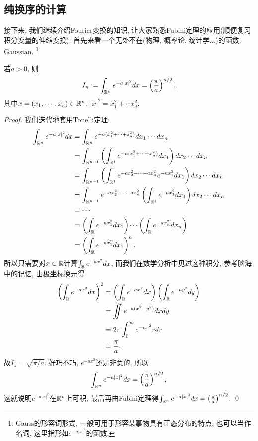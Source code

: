 \subsection{纯换序的计算}
接下来, 我们继续介绍Fourier变换的知识, 让大家熟悉Fubini定理的应用(顺便复习积分变量的伸缩变换). 首先来看一个无处不在(物理, 概率论, 统计学...)的函数: Gaussian.
\footnote{Gauss的形容词形式, 一般可用于形容某事物具有正态分布的特点, 也可以当作名词, 这里指形如$e^{-a|x|^2}$的函数.}
\begin{example}[~(Gaussian)]
    若$a>0$, 则
    $$I_n := \int_{\mathbb{R}^n}e^{-a|x|^2}dx = \left(\frac{\pi}{a}\right)^{n/2},$$
    其中$x=(x_1, \cdots, x_n) \in \mathbb{R}^n$, $|x|^2 = x_1^2 + \cdots x_d^2$.
\end{example}
\begin{proof}
    我们迭代地套用Tonelli定理:
    \begin{align*}
    \int_{\mathbb{R}^n}e^{-a|x|^2}dx 
    &= \int_{\mathbb{R}^n}e^{-a(x_1^2+\cdots+x_n^2)} dx_1 \cdots dx_n \\
    &= \int_{\mathbb{R}^{n-1}}\left(\int_{\mathbb{R}^1}e^{-a(x_1^2+\cdots+x_n^2)}dx_1 \right)dx_2 \cdots dx_n \\
    &= \int_{\mathbb{R}^{n-1}}\left(\int_{\mathbb{R}^1}e^{-ax_2^2-\cdots-ax_n^2}e^{-ax_1^2}dx_1\right) 
       dx_2 \cdots dx_n \\
    &= \int_{\mathbb{R}^{n-1}}e^{-ax_2^2-\cdots-ax_n^2} \left(\int_{\mathbb{R}^1}e^{-ax_1^2}dx_1\right) 
       dx_2 \cdots dx_n \\
    &= \cdots \\
    &= \left(\int_{\mathbb{R}} e^{-ax_1^2}dx_1\right) \cdots \left(\int_{\mathbb{R}} e^{-ax_n^2}dx_n\right) \\
    &= \left(\int_{\mathbb{R}} e^{-ax_1^2}dx_1\right)^n.
    \end{align*}
    所以只需要对$x \in \mathbb{R}$计算$\int_{\mathbb{R}} e^{-ax^2}dx$, 而我们在数学分析中见过这种积分, 参考脑海中的记忆, 由极坐标换元得
    \begin{align*}
    \left(\int_{\mathbb{R}} e^{-ax^2}dx\right)^2
    &= \left(\int_{\mathbb{R}} e^{-ax^2}dx\right)\left(\int_{\mathbb{R}} e^{-ay^2}dy\right) \\
    &= \iint e^{-a(x^2+y^2)} dxdy \\
    &= 2\pi \int_0^\infty e^{-ar^2}r dr \\
    &= \frac{\pi}{a}. 
    \end{align*}
    故$I_1=\sqrt{\pi/a}$. 好巧不巧, $e^{-ax^2}$还是非负的, 所以
    $$\int_{\mathbb{R}^n}e^{-a|x|^2}dx = \left(\frac{\pi}{a}\right)^{n/2},$$
    这就说明$e^{-a|x|^2}$在$\mathbb{R}^n$上可积, 最后再由Fubini定理得$\int_{\mathbb{R}^n}e^{-a|x|^2}dx = \left(\frac{\pi}{a}\right)^{n/2}$.
    \qed 
\end{proof}

